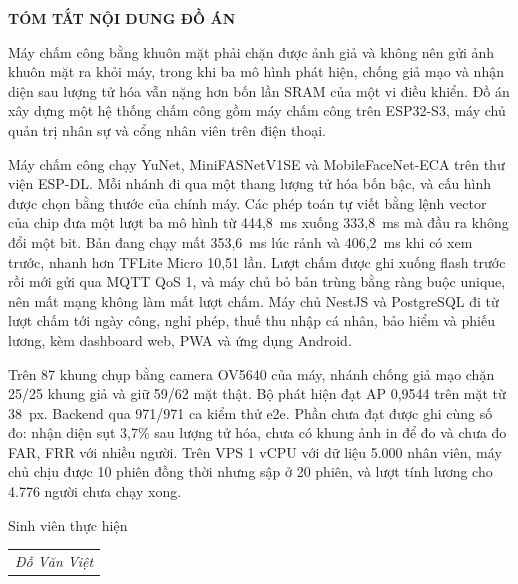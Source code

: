 \documentclass[../DoAn.tex]{subfiles}
\begin{document}
\begin{center}
    \Large{\textbf{TÓM TẮT NỘI DUNG ĐỒ ÁN}}\\
\end{center}
\vspace{1cm}

Máy chấm công bằng khuôn mặt phải chặn được ảnh giả và không nên gửi ảnh khuôn mặt ra khỏi máy, trong khi ba mô hình phát
hiện, chống giả mạo và nhận diện sau lượng tử hóa vẫn nặng hơn bốn lần SRAM của một vi điều khiển. Đồ án xây dựng một hệ
thống chấm công gồm máy chấm công trên ESP32-S3, máy chủ quản trị nhân sự và cổng nhân viên trên điện thoại.

Máy chấm công chạy YuNet, MiniFASNetV1SE và MobileFaceNet-ECA trên thư viện ESP-DL. Mỗi nhánh đi qua một thang lượng tử hóa
bốn bậc, và cấu hình được chọn bằng thước của chính máy. Các phép toán tự viết bằng lệnh vector của chip đưa một lượt ba mô
hình từ 444,8~ms xuống 333,8~ms mà đầu ra không đổi một bit. Bản đang chạy mất 353,6~ms lúc rảnh và 406,2~ms khi có xem
trước, nhanh hơn TFLite Micro 10,51 lần. Lượt chấm được ghi xuống flash trước rồi mới gửi qua MQTT QoS 1, và máy chủ bỏ
bản trùng bằng ràng buộc unique, nên mất mạng không làm mất lượt chấm. Máy chủ NestJS và PostgreSQL đi từ lượt chấm tới
ngày công, nghỉ phép, thuế thu nhập cá nhân, bảo hiểm và phiếu lương, kèm dashboard web, PWA và ứng dụng Android.

Trên 87 khung chụp bằng camera OV5640 của máy, nhánh chống giả mạo chặn 25/25 khung giả và giữ 59/62 mặt thật. Bộ phát hiện
đạt AP 0,9544 trên mặt từ 38~px. Backend qua 971/971 ca kiểm thử e2e. Phần chưa đạt được ghi cùng số đo: nhận diện sụt
3,7\% sau lượng tử hóa, chưa có khung ảnh in để đo và chưa đo FAR, FRR với nhiều người. Trên VPS 1 vCPU với dữ liệu 5.000
nhân viên, máy chủ chịu được 10 phiên đồng thời nhưng sập ở 20 phiên, và lượt tính lương cho 4.776 người chưa chạy xong.

\vspace{1cm}
\begin{flushright}
Sinh viên thực hiện\\
\begin{tabular}{@{}c@{}}
\textit{Đỗ Văn Việt}
\end{tabular}
\end{flushright}
\end{document}
